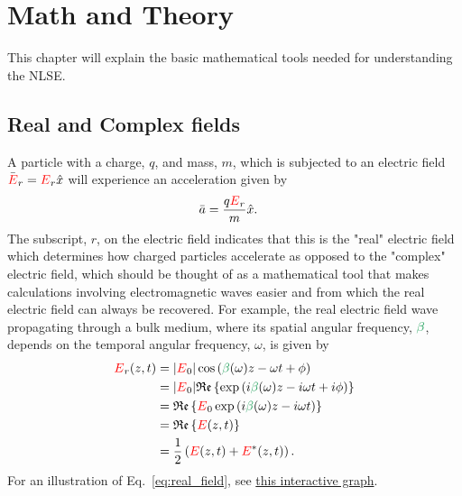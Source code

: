 \chapter{Math and Theory}
\label{ch:MathAndTheory}

This chapter will explain the basic mathematical tools needed for understanding the NLSE.


\section{Real and Complex fields}
A particle with a charge, $q$, and mass, $m$, which is subjected to an electric field $\Bar{\textcolor{red}{E}}_r =\textcolor{red}{E}_r \hat{x}$ will experience an acceleration given by
\begin{align}
    \Bar{a} &=  \frac{q\textcolor{red}{E}_r}{m}\hat{x}.
\end{align}
The subscript, $r$, on the electric field indicates that this is the "real" electric field which determines how charged particles accelerate as opposed to the "complex" electric field, which should be thought of as a mathematical tool that makes calculations involving electromagnetic waves easier and from which the real electric field can always be recovered. For example, the real electric field wave propagating through a bulk medium, where its spatial angular frequency, $\betag$, depends on the temporal angular frequency, $\omega$, is given by  
\begin{align}
\label{eq:real_field}
    \E_r(z,t) &= |\E_0|\cos\left(\betag(\omega)z-\omega t+\phi\right) \\\nonumber 
     &=|\E_0| \real\left\{  \exp\left( i\betag(\omega)z-i\omega t+i\phi \right) \right\} \\ \nonumber 
     &= \real\left\{ \E_0 \exp\left( i\betag(\omega)z-i\omega t\right) \right\}  \\ \nonumber
     &= \real\left\{ \E(z,t) \right\}  \\ \nonumber
     &=  \frac{1}{2}\left( \E(z,t) + \E^*(z,t) \right).   
\end{align}
For an illustration of Eq.~\ref{eq:real_field}, see \href{https://www.desmos.com/calculator/fgvozursrl}{this interactive graph}. 

